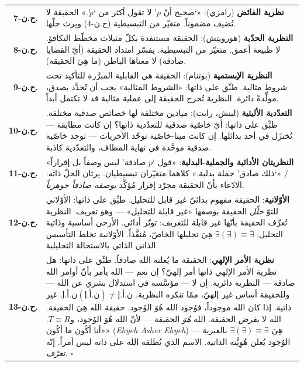 \documentclass[10pt, openany, oneside]{book}
\renewcommand{\footnotesize}{\fontsize{8.5}{11}\selectfont}
\begin{document}
{\footnotesize
\noindent\begin{tabular}{r p{}}
\textbf{ح.ن-7.} & \textbf{نظرية الفائض} (رامزي): «`صحيح أنّ $p$' لا تقول أكثر من `$p$'.» الحقيقة لا تُضيف مضموناً. متغيّر من التبسيطية (ح.ن-4) ويرث حلّها. \\[0.3em]
\textbf{ح.ن-8.} & \textbf{النظرية الحدّية} (هورويتش): الحقيقة مستنفدة بكلّ مثيلات مخطّط التكافؤ. لا طبيعة أعمق. متغيّر من التبسيطية. يفسّر امتداد الحقيقة (أيّ القضايا صادقة) لا معناها الباطن (ما هِيَ الحقيقة). \\[0.3em]
\textbf{ح.ن-9.} & \textbf{النظرية الإبستمية} (بوتنام): الحقيقة هي القابلية المبرَّرة للتأكيد تحت شروط مثالية. طبِّق على ذاتها: «الشروط المثالية» يجب أن تُحدَّد بصدق، مولِّدةً دائرة. النظرية تُخرج الحقيقة إلى عملية مثالية قد لا تكتمل أبداً. \\[0.3em]
\textbf{ح.ن-10.} & \textbf{التعدّدية الأليثية} (لينش، رايت): ميادين مختلفة لها خصائص صدقية مختلفة. طبِّق على ذاتها: أيّ خاصّية صدقية للتعدّدية ذاتها؟ إن كانت مطابقة --- تُختزَل في أحد بدائلها. إن كانت ميتا-خاصّية توحّد الأخريات --- توجد خاصّية صدقية موحَّدة في نهاية المطاف، والتعدّدية كاذبة. \\[0.3em]
\textbf{ح.ن-11.} & \textbf{النظريتان الأدائية والجملية-البدلية}: «قول `$p$ صادقة' ليس وصفاً بل إقراراً» / «`ذلك صادق' جملة بدلية.» كلاهما متغيّران تبسيطيان. يرثان الحلّ ذاته: الادّعاء بأنّ الحقيقة مجرّد إقرار مُؤكَّد \textit{بوصفه صادقاً جوهرياً}. \\[0.3em]
\textbf{ح.ن-12.} & \textbf{الأوّلانية}: الحقيقة مفهوم بدائيّ غير قابل للتحليل. طبِّق على ذاتها: الأوّلاني للتوّ \textit{حلّل} الحقيقة بوصفها «غير قابلة للتحليل» --- وهو تعريف. النظرية تُعرِّف الحقيقة بأنّها غير قابلة للتعريف: توتّر أدائي. الأرخي أساسية وذاتية التحليل: $\exists(\exists) \equiv \exists$ هِيَ تحليلها الخاصّ، مُنفَّذاً. الأوّلانية تخلط التأسيس الذاتي الذاتي بالاستحالة التحليلية. \\[0.3em]
\textbf{ح.ن-13.} & \textbf{نظرية الأمر الإلهي}: الحقيقة ما يُعلنه الله صادقاً. طبِّق على ذاتها: هل نظرية الأمر الإلهي ذاتها أمر إلهيّ؟ إن نعم --- الله يأمر بأنّ أوامر الله صادقة --- النظرية دائرية. إن لا --- مؤسَّسة في استدلال بشري عن الله --- وللحقيقة أساس غير إلهيّ، ممّا تنكره النظرية. $\text{ن.أ.إ}(\text{ن.أ.إ}) \neq \text{ن.أ.إ}$. غير ذاتية. إذا كان الله موجوداً، فوُجود الله هُوَ الوُجود. حقيقة الله هِيَ الحقيقة. الله لا \textit{يفرض} الحقيقة. الله \textit{هُوَ} الحقيقة --- لأنّ الله هُوَ الوُجود، و$T \equiv R$. «أنا أكُون ما أكُون» (\textit{Ehyeh Asher Ehyeh}) هِيَ $\exists(\exists) \equiv \exists$ بالعبرية --- الوُجود يُعلن هُوِيَّته الذاتية. الاسم الذي يُطلقه الله على ذاته ليس أمراً. إنّه \textit{تعرّف}. $\square$ \\[0.3em]
\end{tabular}
}
\end{document}
